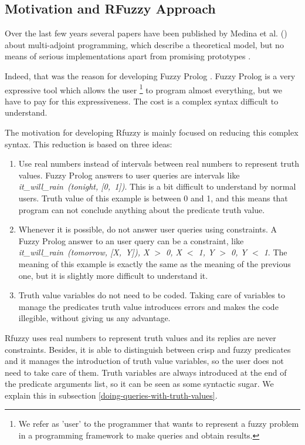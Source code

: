 \documentclass[runningheads,a4paper]{llncs}
\begin{document}
\subsection{Motivation and RFuzzy Approach}
\label{subsec:motivation}

Over the last few years several papers have been published by Medina
et al.
(\cite{M_Adjoint_Continuous,M_Adjoint_Procedural,M_Adjoint_Completeness})
about multi-adjoint programming, which describe a theoretical model,
but no means of serious implementations apart from promising
prototypes \cite{Abietar07}.

Indeed, that was the reason for developing Fuzzy Prolog \cite{Susana_FSS04}.
Fuzzy Prolog  is a very expressive tool which allows the 
user \footnote{We refer as 'user' to the programmer that
  wants to represent a fuzzy problem in a programming framework to make
  queries and obtain results.}
to program almost everything, but we have to pay for this
expressiveness.
The cost is a complex syntax difficult to understand.

The motivation for developing Rfuzzy is mainly focused on reducing this 
complex syntax. This reduction is based on three ideas:
\begin{enumerate}
\item Use real numbers instead of intervals between real numbers to 
  represent truth values.
  Fuzzy Prolog answers to user queries are intervals like \\
  {\it it\_will\_rain\ (tonight, [0,\ 1])}. 
  This is a bit difficult to understand by normal users.
  Truth value of this example is between 0 and 1, and this means that 
  program can not conclude anything about the predicate truth value.
\item Whenever it is possible, do not answer user queries using 
  constraints.
  A Fuzzy Prolog answer to an user query can be a constraint, like \\
  {\it it\_will\_rain\ (tomorrow, [X,\ Y]), X $>$ 0, X $<$ 1, Y $>$ 0, Y $<$ 1}.
  The meaning of this example is exactly the same as the meaning of 
  the previous one, but it is slightly more difficult to understand it.
\item Truth value variables do not need to be coded. 
  Taking care of variables to manage the predicates truth value 
  introduces errors and makes the code illegible, without giving us 
  any advantage.
\end{enumerate}

Rfuzzy uses real numbers to represent truth values and its replies are 
never constraints. 
Besides, it is able to distinguish between crisp and fuzzy predicates
and it manages the introduction of truth value variables, so the 
user does not need to take care of them.
Truth variables are always introduced at the end of 
the predicate arguments list, so it can be seen as some syntactic 
sugar. We explain this in subsection \ref{doing-queries-with-truth-values}.
\end{document}
